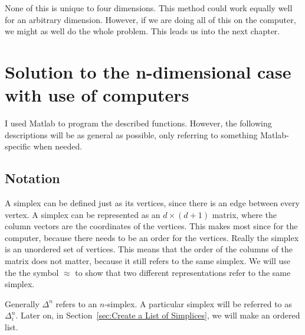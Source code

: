\documentclass[12pt]{scrippsthesis}
\theoremstyle{definition}
\theoremstyle{remark}
\theoremstyle{plain}
\begin{document}
None of this is unique to four dimensions.  This method could work equally well for an arbitrary dimension.  However, if we are doing all of this on the computer, we might as well do the whole problem.  This leads us into the next chapter.





\chapter{Solution to the n-dimensional case with use of computers}


I used Matlab to program the described functions.  However, the following descriptions will be as general as possible, only referring to something Matlab-specific when needed.




\section{Notation}
\label{sec:notation}

A simplex can be defined just as its vertices, since there is an edge between every vertex.  A simplex can be represented as an $d \times (d+1)$ matrix, where the column vectors are the coordinates of the vertices.  This makes most since for the computer, because there needs to be an order for the vertices.  Really the simplex is an unordered set of vertices.  This means that the order of the columns of the matrix does not matter, because it still refers to the same simplex.  We will use the the symbol $\approx$ to show that two different representations refer to the same simplex.

Generally $\Delta^n$ refers to an $n$-simplex.  A particular simplex will be referred to as $\Delta^n_i$.  Later on, in Section~\ref{sec:Create a List of Simplices}, we will make an ordered list.
\end{document}
